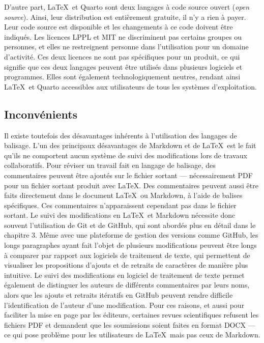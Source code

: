 \documentclass[
  letterpaper,
  DIV=11,
  numbers=noendperiod]{scrreprt}
\begin{document}
D'autre part, \LaTeX~et Quarto sont deux langages à code source ouvert
(\emph{open source}). Ainsi, leur distribution est entièrement gratuite,
il n'y a rien à payer. Leur code source est disponible et les
changements à ce code doivent être indiqués. Les licences LPPL et MIT ne
discriminent pas certains groupes ou personnes, et elles ne restreignent
personne dans l'utilisation pour un domaine d'activité. Ces deux
licences ne sont pas spécifiques pour un produit, ce qui signifie que
ces deux langages peuvent être utilisés dans plusieurs logiciels et
programmes. Elles sont également technologiquement neutres, rendant
ainsi \LaTeX~et Quarto accessibles aux utilisateurs de tous les systèmes
d'exploitation.

\subsection{Inconvénients}\label{inconvuxe9nients}

Il existe toutefois des désavantages inhérents à l'utilisation des
langages de balisage. L'un des principaux désavantages de Markdown et de
\LaTeX~est le fait qu'ils ne comportent aucun système de suivi des
modifications lors de travaux collaboratifs. Pour réviser un travail
fait en langage de balisage, des commentaires peuvent être ajoutés sur
le fichier sortant --- nécessairement PDF pour un fichier sortant
produit avec \LaTeX. Des commentaires peuvent aussi être faits
directement dans le document \LaTeX~ou Markdown, à l'aide de balises
spécifiques. Ces commentaires n'apparaissent cependant pas dans le
fichier sortant. Le suivi des modifications en \LaTeX~et Markdown
nécessite donc souvent l'utilisation de Git et de GitHub, qui sont
abordés plus en détail dans le chapitre 3. Même avec une plateforme de
gestion des versions comme GitHub, les longs paragraphes ayant fait
l'objet de plusieurs modifications peuvent être longs à comparer par
rapport aux logiciels de traitement de texte, qui permettent de
visualiser les propositions d'ajouts et de retraits de caractères de
manière plus intuitive. Le suivi des modifications en logiciel de
traitement de texte permet également de distinguer les auteurs de
différents commentaires par leurs noms, alors que les ajouts et retraits
itératifs en GitHub peuvent rendre difficile l'identification de
l'auteur d'une modification. Pour ces raisons, et aussi pour faciliter
la mise en page par les éditeurs, certaines revues scientifiques
refusent les fichiers PDF et demandent que les soumissions soient faites
en format DOCX --- ce qui pose problème pour les utilisateurs de
\LaTeX~mais pas ceux de Markdown.
\end{document}

